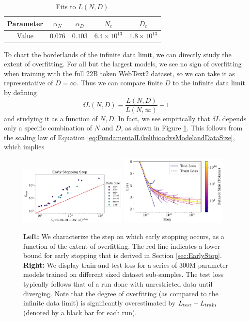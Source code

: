 \documentclass[english]{article}
\newcommand{\be}{\begin{equation}}
\newcommand{\ee}{\end{equation}}
\begin{document}
\begin{table}[h!]
\centering
\vspace{-0.5em}
\begin{tabular}{|c| c | c | c | c|} 
 \hline
Parameter & $\alpha_N$ & $\alpha_D$ & $N_c$ & $D_c$ \\ [0.5ex] 
 \hline\hline
Value  & $0.076$ & $0.103$ & $6.4 \times 10^{13}$ & $1.8 \times 10^{13}$ \\ 
 \hline
\end{tabular}
\vspace{0.5em}
\caption{Fits to $L(N, D)$}
\vspace{-1em}
\end{table}

To chart the borderlands of the infinite data limit, we can directly study the extent of overfitting.  For all but the largest models, we see no sign of overfitting when training with the full 22B token WebText2 dataset, so we can take it as representative of $D=\infty$.  Thus we can compare finite $D$ to the infinite data limit by defining
\be
\delta L(N, D) \equiv \frac{L(N, D)}{L(N, \infty)} - 1
\ee
and studying it as a function of $N, D$.   In fact, we see empirically that $\delta L$ depends only a specific combination of $N$ and $D$, as shown in Figure \ref{fig:OverfittingandEarlyStopping}.  This follows from the scaling law of Equation \eqref{eq:FundamentalLikelihioodvsModelandDataSize}, which implies

\begin{figure}
\noindent \centering{} 
\includegraphics[width=0.48\textwidth]{EarlyStoppingvsNandD}\hfill
\includegraphics[width=0.48\textwidth]{TrainVsTestMedium}
\caption[Early stopping lower bound and training curves for overfit models]{ {\bf Left:}  We characterize the step on which early stopping occurs, as a function of the extent of overfitting.  The red line indicates a {lower bound} for early stopping that is derived in Section \ref{sec:EarlyStop}.  {\bf Right:} We display train and test loss for a series of 300M parameter models trained on different sized dataset sub-samples.  The test loss typically follows that of a run done with unrestricted data until diverging. Note that the degree of overfitting (as compared to the infinite data limit) is significantly overestimated by $L_{\rm test} - L_{\rm train}$ (denoted by a black bar for each run). \label{fig:OverfittingandEarlyStopping}}
\end{figure}
\end{document}
